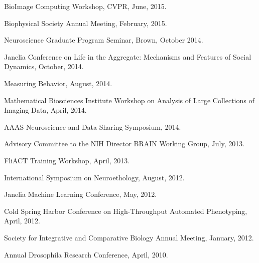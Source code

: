 \documentclass[11pt, letterpaper]{awesome-cv}
\begin{document}
\begin{cvitems}
\item BioImage Computing Workshop, CVPR, June, 2015.
\item Biophysical Society Annual Meeting, February, 2015.
\item Neuroscience Graduate Program Seminar, Brown, October 2014. 
\item Janelia Conference on Life in the Aggregate: Mechanisms and Features of Social Dynamics, October, 2014. 
\item Measuring Behavior, August, 2014.
\item Mathematical Biosciences Institute Workshop on Analysis of Large Collections of Imaging Data, April, 2014. 
\item AAAS Neuroscience and Data Sharing Symposium, 2014. 
\item Advisory Committee to the NIH Director BRAIN Working Group, July, 2013.
\item FliACT Training Workshop, April, 2013. 
\item International Symposium on Neuroethology, August, 2012. 
\item Janelia Machine Learning Conference, May, 2012. 
\item Cold Spring Harbor Conference on High-Throughput Automated Phenotyping, April, 2012. 
\item Society for Integrative and Comparative Biology Annual Meeting, January, 2012. 
\item Annual Drosophila Research Conference, April, 2010. 
\end{cvitems}



\end{document}
